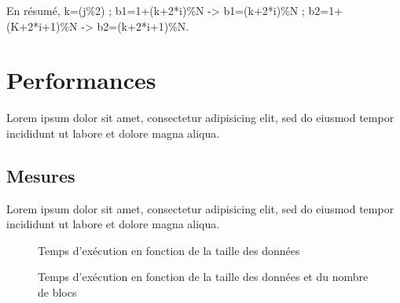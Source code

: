 \documentclass[12pt]{article}
\begin{document}
    En résumé, k=(j\%2) ; b1=1+(k+2*i)\%N -> b1=(k+2*i)\%N ; b2=1+(K+2*i+1)\%N -> b2=(k+2*i+1)\%N.

\section{Performances}

Lorem ipsum dolor sit amet, consectetur adipisicing elit, sed do eiusmod tempor
incididunt ut labore et dolore magna aliqua.

\subsection{Mesures}

Lorem ipsum dolor sit amet, consectetur adipisicing elit, sed do eiusmod tempor
incididunt ut labore et dolore magna aliqua.

\begin{figure}
    \begin{center}
        \caption{Temps d'exécution en fonction de la taille des données}
        \label{time-to-data-size}
    \end{center}
\end{figure}

\begin{figure}
    \begin{center}
        \caption{Temps d'exécution en fonction de la taille des données et du nombre de blocs}
        \label{time-to-data-size-and-blocks}
    \end{center}
\end{figure}
\end{document}
